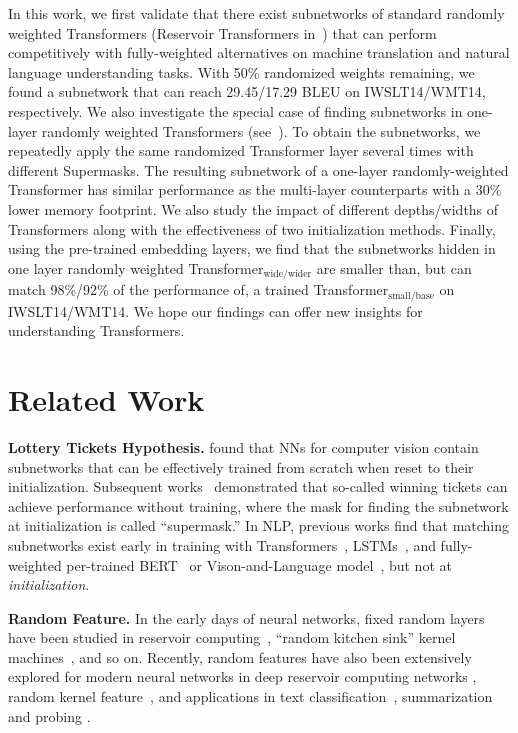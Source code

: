 In this work, we first validate that there exist subnetworks of standard randomly weighted Transformers (Reservoir Transformers in~\citep{shen2020reservoir}) that can perform competitively with fully-weighted alternatives on machine translation and natural language understanding tasks. 
With 50\% randomized weights remaining, we found a subnetwork that can reach 29.45/17.29 BLEU on IWSLT14/WMT14, respectively. 
We also investigate the special case of finding subnetworks in one-layer randomly weighted Transformers (see~). 
To obtain the subnetworks, we repeatedly apply the same randomized Transformer layer several times with different Supermasks. 
The resulting subnetwork of a one-layer randomly-weighted Transformer has similar performance as the multi-layer counterparts with a 30\% lower memory footprint. 
We also study the impact of different depths/widths of Transformers along with the effectiveness of two initialization methods. 
Finally, using the pre-trained embedding layers, we find that the subnetworks hidden in one layer randomly weighted Transformer$_\text{wide/wider}$ are smaller than, but can match 98\%/92\% of the performance of, a trained Transformer$_\text{small/base}$ on IWSLT14/WMT14. 
We hope our findings can offer new insights for understanding Transformers. 
\section{Related Work}
\vspace{-1mm}
\noindent\textbf{Lottery Tickets Hypothesis.}
\citet{frankle2018lottery} found that NNs for computer vision contain subnetworks that can be effectively trained from scratch when reset to their initialization.
Subsequent works~\citep{Zhou:2019deconstructing,Ramanujan:2020hidden,wortsman2020supermasks} demonstrated that so-called winning tickets can achieve performance without training, where the mask for finding the subnetwork at initialization is called ``supermask.'' 
In NLP, previous works find that matching subnetworks exist early in training with Transformers~\citep{yu2019playing}, LSTMs~\citep{renda2020comparing}, and fully-weighted per-trained BERT~\citep{chen2020lottery,prasanna2020bert} or Vison-and-Language model~\citep{gan2021playing}, but not at \textit{initialization}. 

\noindent\textbf{Random Feature.} 
In the early days of neural networks, fixed random layers~\citep{Baum:1988jc,Schmidt:1992pr,Pao:1994nc} have been studied in reservoir computing~\citep{Maass:2002lsm,Jaeger:2003echostate,Lukovsevivcius:2009reservoir}, ``random kitchen sink'' kernel machines~\citep{Rahimi:2008random,Rahimi:2009kitchen}, and so on. 
Recently, random features have also been extensively explored for modern neural networks in deep reservoir computing networks \citep{Scardapane:2017randomness,Gallicchio:2017echo,shen2020reservoir}, random kernel feature~\citep{peng2021random,Choromanski:2020performer}, and  applications in text classification~\citep{Conneau:2017infersent,Wieting:2019notraining}, summarization \citep{Pilault:2020impressive} and probing \citep{voita2020information}. 

